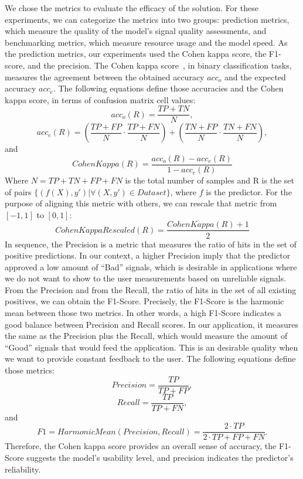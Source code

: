 We chose the metrics to evaluate the efficacy of the solution. For these experiments, we can categorize the metrics into two groups: prediction metrics, which measure the quality of the model's signal quality assessments, and benchmarking metrics, which measure resource usage and the model speed. As the prediction metrics, our experiments used the Cohen kappa score, the F1-score, and the precision. The Cohen kappa score~\cite{CohenKappa}, in binary classification tasks, measures the agreement between the obtained accuracy $acc_o$ and the expected accuracy $acc_e$. The following equations define those accuracies and the Cohen kappa score, in terms of confusion matrix cell values:
\begin{equation} 
acc_o(R) = \frac{TP+TN}{N},
\end{equation}
\begin{equation}
acc_e(R)  = \left(\frac{TP+FP}{N} \cdot \frac{TP+FN}{N}\right) + \left(\frac{TN+FP}{N} \cdot \frac{TN+FN}{N}\right),
\end{equation}
and
\begin{equation} \label{eq:Cohen kappa}
CohenKappa(R)  = \frac{acc_o(R) - acc_e(R)}{1 - acc_e(R)} 
\end{equation}  
\noindent Where $N=TP+TN+FP+FN$ is the total number of samples and R is the set of pairs $\{(f(X),y') | \forall (X,y') \in Dataset\}$, where $f$ is the predictor. For the purpose of aligning this metric with others, we can rescale that metric from $[-1,1]$ to $[0,1]$:
\begin{equation}
CohenKappaRescaled(R) = \frac{CohenKappa(R)+1}{2} 
\end{equation}  
In sequence, the Precision is a metric that measures the ratio of hits in the set of positive predictions. In our context, a higher Precision imply that the predictor approved a low amount of ``Bad'' signals, which is desirable in applications where we do not want to show to the user measurements based on unreliable signals. From the Precision and from the Recall, the ratio of hits in the set of all existing positives, we can obtain the F1-Score. Precisely, the F1-Score is the harmonic mean between those two metrics. In other words, a high F1-Score indicates a good balance between Precision and Recall scores. In our application, it measures the same as the Precision plus the Recall, which would measure the amount of ``Good'' signals that would feed the application. This is an desirable quality when we want to provide constant feedback to the user. The following equations define those metrics:
\begin{equation} \label{eq:Precision}
Precision = \frac{TP}{TP+FP},
\end{equation}
\begin{equation} \label{eq:Recall}
Recall = \frac{TP}{TP+FN},
\end{equation}
and
\begin{equation} \label{eq:F1-Score}
F1 = HarmonicMean(Precision,Recall) = \frac{2 \cdot TP}{2 \cdot TP + FP + FN}.
\end{equation}
\noindent Therefore, the Cohen kappa score provides an overall sense of accuracy, the F1-Score suggests the model's usability level, and precision indicates the predictor's reliability.

